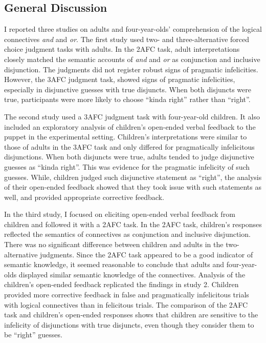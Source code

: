 \documentclass[man]{apa6}
\theoremstyle{definition}
\theoremstyle{definition}
\theoremstyle{definition}
\theoremstyle{remark}
\begin{document}
\subsection{General Discussion}\label{general-discussion}

I reported three studies on adults and four-year-olds' comprehension of
the logical connectives \emph{and} and \emph{or}. The first study used
two- and three-alternative forced choice judgment tasks with adults. In
the 2AFC task, adult interpretations closely matched the semantic
accounts of \emph{and} and \emph{or} as conjunction and inclusive
disjunction. The judgments did not register robust signs of pragmatic
infelicities. However, the 3AFC judgment task, showed signs of pragmatic
infelicities, especially in disjunctive guesses with true disjuncts.
When both disjuncts were true, participants were more likely to choose
\enquote{kinda right} rather than \enquote{right}.

The second study used a 3AFC judgment task with four-year-old children.
It also included an exploratory analysis of children's open-ended verbal
feedback to the puppet in the experimental setting. Children's
interpretations were similar to those of adults in the 3AFC task and
only differed for pragmatically infelicitous disjunctions. When both
disjuncts were true, adults tended to judge disjunctive guesses as
\enquote{kinda right}. This was evidence for the pragmatic infelicity of
such guesses. While, children judged such disjunctive statement as
\enquote{right}, the analysis of their open-ended feedback showed that
they took issue with such statements as well, and provided appropriate
corrective feedback.

In the third study, I focused on eliciting open-ended verbal feedback
from children and followed it with a 2AFC task. In the 2AFC task,
children's responses reflected the semantics of connectives as
conjunction and inclusive disjunction. There was no significant
difference between children and adults in the two-alternative judgments.
Since the 2AFC task appeared to be a good indicator of semantic
knowledge, it seemed reasonable to conclude that adults and
four-year-olds displayed similar semantic knowledge of the connectives.
Analysis of the children's open-ended feedback replicated the findings
in study 2. Children provided more corrective feedback in false and
pragmatically infelicitous trials with logical connectives than in
felicitous trials. The comparison of the 2AFC task and children's
open-ended responses shows that children are sensitive to the infelicity
of disjunctions with true disjuncts, even though they consider them to
be \enquote{right} guesses.
\end{document}
